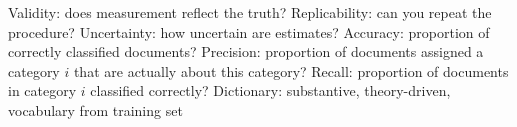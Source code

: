 \documentclass[kp]{foilpack}
\begin{document}


\ita

\itm Validity: does measurement reflect the truth?
\itm Replicability: can you repeat the procedure?
\itm Uncertainty: how uncertain are estimates?
\itm Accuracy: proportion of correctly classified documents?
\itm Precision: proportion of documents assigned a category $i$ that are actually about this category?
\itm Recall: proportion of documents in category $i$ classified correctly?
\itm Dictionary: substantive, theory-driven, vocabulary from training set
\itz
\end{document}
